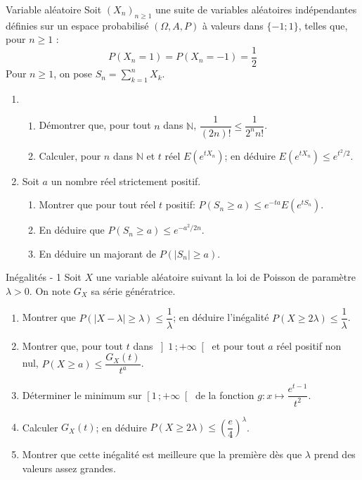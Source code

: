 \documentclass[french, a4paper, 11pt]{article}
\newcommand{\N}{\mathbb{N}}   %
\newcommand{\po}{\left(}         %
\newcommand{\pf}{\right)}        %
\newcommand{\pof}[1]{\po #1 \pf} %
\newcommand{\interoo}[2]{\left]#1\,;#2\right[}   %
\newcommand{\interfo}[2]{\left[#1\,;#2\right[}   %
\begin{document}
\begin{cadre}{Variable aléatoire}
  Soit \(\pof{X_{n}}_{n\geqslant 1}\) une suite de variables aléatoires indépendantes définies sur un espace probabilisé \(\pof{\Omega, A, P}\) à valeurs dans \(\lbrace -1;1\rbrace\), telles que, pour \(n\geqslant 1\) :
  \[P\pof{X_{n} = 1} = P\pof{X_{n} = -1} = \dfrac{1}{2}\]
  Pour \(n\geqslant 1\), on pose \(S_{n} = \sum_{k=1}^{n} X_{k}\).
  \begin{enumerate}
      \item
      \begin{enumerate}
        \item Démontrer que, pour tout \(n\) dans \(\N\), \(\dfrac{1}{(2n)!}\leqslant\dfrac{1}{2^{n}n!}\).
        \item Calculer, pour \(n\) dans \(\N\) et \(t\) réel \(E\pof{e^{tX_{n}}}\); en déduire \(E(e^{tX_{n}}) \leqslant e^{t^{2}/2}\).
      \end{enumerate}
    \item Soit \(a\) un nombre réel strictement positif.
      \begin{enumerate}
        \item Montrer que pour tout réel \(t\) positif: \(P(S_{n}\geqslant a) \leqslant e^{-ta}E(e^{tS_{n}})\).
        \item En déduire que \(P(S_{n}\geqslant a)\leqslant e^{-a^{2}/2n}\).
        \item En déduire un majorant de \(P\po\lvert S_{n}\rvert \geqslant a\pf\).
      \end{enumerate}
  \end{enumerate}
\end{cadre}

\begin{cadre}{Inégalités - 1}
  Soit $X$ une variable aléatoire suivant la loi de Poisson de paramètre $\lambda >0$. On note $G_{X}$ sa série génératrice.
  \begin{enumerate}
    \item Montrer que $P\pof{\lvert X-\lambda\rvert \geqslant \lambda}\leqslant \dfrac{1}{\lambda}$; en déduire l'inégalité $P(X\geqslant 2\lambda) \leqslant \dfrac{1}{\lambda}$.
    \item Montrer que, pour tout $t$ dans $\interoo{1}{+\infty}$ et pour tout $a$ réel positif non nul, $P(X\geqslant a)\leqslant \dfrac{G_{X}(t)}{t^{a}}$.
    \item Déterminer le minimum sur $\interfo{1}{+\infty}$ de la fonction $g:x\mapsto\dfrac{e^{t-1}}{t^{2}}$.
    \item Calculer $G_{X}(t)$; en déduire $P(X\geqslant 2\lambda)\leqslant\pof{\dfrac{e}{4}}^{\lambda}$.
    \item Montrer que cette inégalité est meilleure que la première dès que $\lambda$ prend des valeurs assez grandes.
  \end{enumerate}
\end{cadre}
\end{document}
